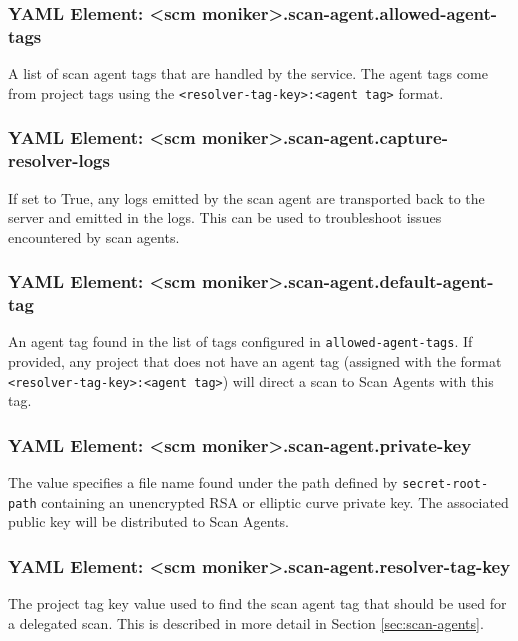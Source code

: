 \subsubsection{YAML Element: <scm moniker>.scan-agent.allowed-agent-tags}\label{sec:yaml-scan-agent-allowed-agent-tags}
A list of scan agent tags that are handled by the \cxoneflow service.  The agent tags come from
\cxone project tags using the \texttt{<resolver-tag-key>:<agent tag>} format.  

\subsubsection{YAML Element: <scm moniker>.scan-agent.capture-resolver-logs}\label{sec:yaml-scan-agent-capture-resolver-logs}
If set to True, any logs emitted by the scan agent are transported back to the \cxoneflow server and
emitted in the \cxoneflow logs.  This can be used to troubleshoot issues encountered by scan agents.

\subsubsection{YAML Element: <scm moniker>.scan-agent.default-agent-tag}\label{sec:yaml-scan-agent-default-agent-tag}
An agent tag found in the list of tags configured in \texttt{allowed-agent-tags}.  If provided,
any \cxone project that does not have an agent tag (assigned with the format \texttt{<resolver-tag-key>:<agent tag>})
will direct a scan to Scan Agents with this tag.

\subsubsection{YAML Element: <scm moniker>.scan-agent.private-key}\label{sec:yaml-scan-agent-private-key}
The value specifies a file name found under the path defined by \texttt{secret-root-path}
containing an unencrypted RSA or elliptic curve private key.  The associated public key will be distributed to
Scan Agents.

\subsubsection{YAML Element: <scm moniker>.scan-agent.resolver-tag-key}\label{sec:yaml-scan-agent-resolver-tag-key}
The \cxone project tag key value used to find the scan agent tag that should be used for a delegated scan.
This is described in more detail in Section \ref{sec:scan-agents}.

